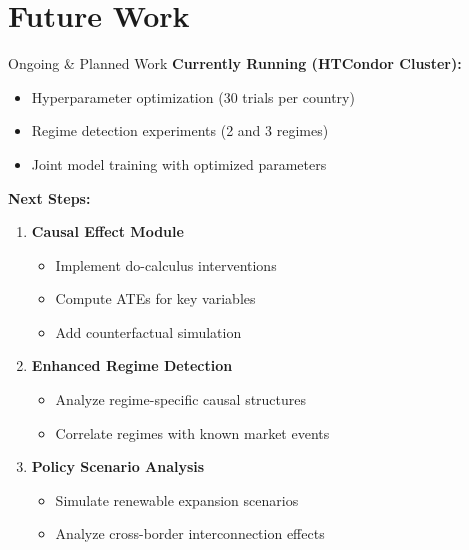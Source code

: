 \documentclass[aspectratio=169]{beamer}
\begin{document}
\section{Future Work}

\begin{frame}{Ongoing \& Planned Work}
\textbf{Currently Running (HTCondor Cluster):}
\begin{itemize}
    \item Hyperparameter optimization (30 trials per country)
    \item Regime detection experiments (2 and 3 regimes)
    \item Joint model training with optimized parameters
\end{itemize}

\vspace{0.3cm}
\textbf{Next Steps:}
\begin{enumerate}
    \item \textbf{Causal Effect Module}
    \begin{itemize}
        \item Implement do-calculus interventions
        \item Compute ATEs for key variables
        \item Add counterfactual simulation
    \end{itemize}

    \item \textbf{Enhanced Regime Detection}
    \begin{itemize}
        \item Analyze regime-specific causal structures
        \item Correlate regimes with known market events
    \end{itemize}

    \item \textbf{Policy Scenario Analysis}
    \begin{itemize}
        \item Simulate renewable expansion scenarios
        \item Analyze cross-border interconnection effects
    \end{itemize}
\end{enumerate}
\end{frame}
\end{document}
